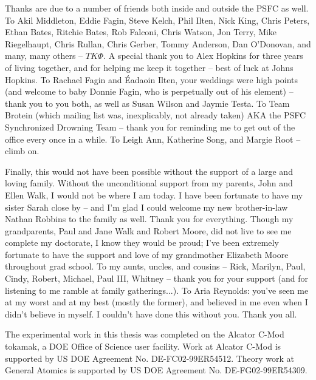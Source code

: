 Thanks are due to a number of friends both inside and outside the PSFC as well.  To Akil Middleton, Eddie Fagin, Steve Kelch, Phil Ilten, Nick King, Chris Peters, Ethan Bates, Ritchie Bates, Rob Falconi, Chris Watson, Jon Terry, Mike Riegelhaupt, Chris Rullan, Chris Gerber, Tommy Anderson, Dan O'Donovan, and many, many others -- $TK \Phi$.  A special thank you to Alex Hopkins for three years of living together, and for helping me keep it together -- best of luck at Johns Hopkins.  To Rachael Fagin and \'Eadaoin Ilten, your weddings were high points (and welcome to baby Donnie Fagin, who is perpetually out of his element) -- thank you to you both, as well as Susan Wilson and Jaymie Testa.  To Team Brotein (which mailing list was, inexplicably, not already taken) AKA the PSFC Synchronized Drowning Team -- thank you for reminding me to get out of the office every once in a while.  To Leigh Ann, Katherine Song, and Margie Root -- climb on.

Finally, this would not have been possible without the support of a large and loving family.  Without the unconditional support from my parents, John and Ellen Walk, I would not be where I am today.  I have been fortunate to have my sister Sarah close by -- and I'm glad I could welcome my new brother-in-law Nathan Robbins to the family as well.  Thank you for everything.  Though my grandparents, Paul and Jane Walk and Robert Moore, did not live to see me complete my doctorate, I know they would be proud; I've been extremely fortunate to have the support and love of my grandmother Elizabeth Moore throughout grad school.  To my aunts, uncles, and cousins -- Rick, Marilyn, Paul, Cindy, Robert, Michael, Paul III, Whitney -- thank you for your support (and for listening to me ramble at family gatherings...).  To Aria Reynolds: you've seen me at my worst and at my best (mostly the former), and believed in me even when I didn't believe in myself.  I couldn't have done this without you.  Thank you all.

The experimental work in this thesis was completed on the Alcator C-Mod tokamak, a DOE Office of Science user facility.  Work at Alcator C-Mod is supported by US DOE Agreement No. DE-FC02-99ER54512.  Theory work at General Atomics is supported by US DOE Agreement No. DE-FG02-99ER54309.
